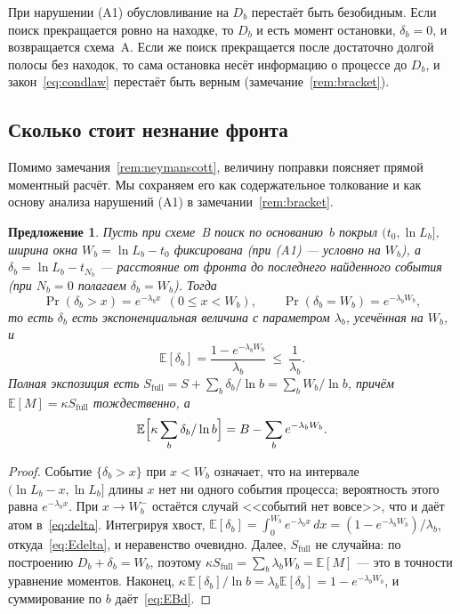 \documentclass[11pt,a4paper]{article}
\theoremstyle{plain}
\newtheorem{proposition}{Предложение}
\theoremstyle{remark}
\begin{document}
\noindent При нарушении (A1) обусловливание на $D_b$ перестаёт быть безобидным.
Если поиск прекращается ровно на находке, то $D_b$ и есть момент остановки,
$\delta_b=0$, и возвращается схема~A. Если же поиск прекращается после
достаточно долгой полосы без находок, то сама остановка несёт информацию о
процессе до $D_b$, и закон~\eqref{eq:condlaw} перестаёт быть верным
(замечание~\ref{rem:bracket}).

\subsection{Сколько стоит незнание фронта}\label{sec:cost}

Помимо замечания~\ref{rem:neymanscott}, величину поправки поясняет прямой
моментный расчёт. Мы сохраняем его как содержательное толкование и как основу
анализа нарушений (A1) в замечании~\ref{rem:bracket}.

\begin{proposition}\label{prop:delta}
Пусть при схеме~B поиск по основанию~$b$ покрыл $(t_0,\ln L_b]$, ширина окна
$W_b=\ln L_b-t_0$ фиксирована (при (A1) --- условно на $W_b$), а
$\delta_b=\ln L_b-t_{N_b}$ --- расстояние от фронта до последнего
найденного события (при $N_b=0$ полагаем $\delta_b=W_b$). Тогда
\begin{equation}\label{eq:delta}
\Pr(\delta_b>x)=e^{-\lambda_b x}\ \ (0\le x<W_b),\qquad
\Pr(\delta_b=W_b)=e^{-\lambda_b W_b},
\end{equation}
то есть $\delta_b$ есть экспоненциальная величина с параметром $\lambda_b$,
усечённая на $W_b$, и
\begin{equation}\label{eq:Edelta}
\mathbb E[\delta_b]=\frac{1-e^{-\lambda_b W_b}}{\lambda_b}\ \le\ \frac{1}{\lambda_b}.
\end{equation}
Полная экспозиция есть $S_{\mathrm{full}}=S+\sum_b\delta_b/\ln b=\sum_b W_b/\ln b$,
причём $\mathbb E[M]=\kappa S_{\mathrm{full}}$ тождественно, а
\begin{equation}\label{eq:EBd}
\mathbb E\Bigl[\kappa\sum_b\delta_b/\ln b\Bigr]=B-\sum_b e^{-\lambda_b W_b}.
\end{equation}
\end{proposition}

\begin{proof}
Событие $\{\delta_b>x\}$ при $x<W_b$ означает, что на интервале
$(\ln L_b-x,\ln L_b]$ длины $x$ нет ни одного события процесса; вероятность этого
равна $e^{-\lambda_b x}$. При $x\to W_b^-$ остаётся случай <<событий нет вовсе>>,
что и даёт атом в~\eqref{eq:delta}. Интегрируя хвост,
$\mathbb E[\delta_b]=\int_0^{W_b}e^{-\lambda_b x}\,dx=(1-e^{-\lambda_b W_b})/\lambda_b$,
откуда~\eqref{eq:Edelta}, и неравенство очевидно. Далее, $S_{\mathrm{full}}$ не
случайна: по построению $D_b+\delta_b=W_b$, поэтому
$\kappa S_{\mathrm{full}}=\sum_b\lambda_b W_b=\mathbb E[M]$ --- это в точности
уравнение моментов. Наконец,
$\kappa\,\mathbb E[\delta_b]/\ln b=\lambda_b\mathbb E[\delta_b]=1-e^{-\lambda_b W_b}$,
и суммирование по $b$ даёт~\eqref{eq:EBd}.
\end{proof}
\end{document}
